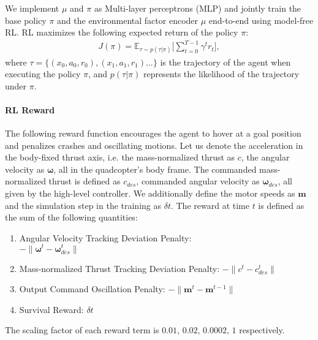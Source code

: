 
We implement $\mu$ and $\pi$ as Multi-layer perceptrons (MLP) and jointly train the base policy $\pi$ and the environmental factor encoder $\mu$ end-to-end using model-free RL. RL maximizes the following expected return of the policy $\pi$: 
\begin{align}
    J(\pi) = \mathbb{E}_{\tau \sim p(\tau|\pi)}\Bigg[\sum_{t=0}^{T-1}\gamma^t r_t\Bigg],
\end{align}
where $\tau = \{(x_0, a_0, r_0), (x_1, a_1, r_1) . . .\}$ is the trajectory of the agent when executing the policy $\pi$, and $p(\tau|\pi)$ represents the likelihood of the trajectory under $\pi$.

\paragraph{RL Reward} The following reward function encourages the agent to hover at a goal position and penalizes crashes and oscillating motions. Let us denote the acceleration in the body-fixed thrust axis, i.e. the mass-normalized thrust as $c$, the angular velocity as $\bm{\omega}$, all in the quadcopter's body frame. The commanded mass-normalized thrust is defined as $c_{des}$, commanded angular velocity as $\bm{\omega}_{des}$, all given by the high-level controller.
We additionally define the motor speeds as $\bm{m}$ and the simulation step in the training as $\delta t$. The reward at time $t$ is defined as the sum of the following quantities:
\begin{enumerate}
    \item Angular Velocity Tracking Deviation Penalty: \\$-\| \bm{\omega}^{t} - \bm{\omega}_{des}^{t} \|$
    \item Mass-normalized Thrust Tracking Deviation Penalty: $-\| {c}^{t} - {c}_{des}^{t} \|$
    \item Output Command Oscillation Penalty: $-\| \bm{m}^{t} - \bm{m}^{t-1} \|$
    \item Survival Reward: $\delta t$
\end{enumerate}
The scaling factor of each reward term is $0.01$, $0.02$, $0.0002$, $1$ respectively. 

